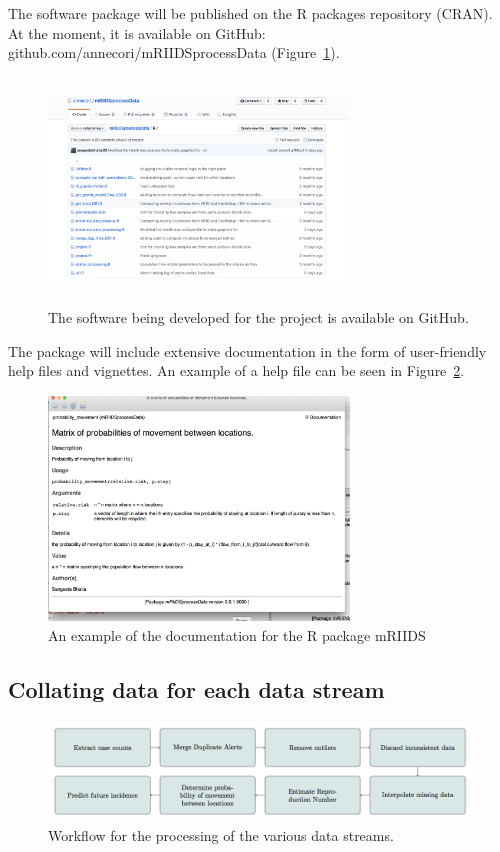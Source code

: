 \documentclass[11pt,]{article}
\begin{document}
The software
package will be published on the R packages repository
(CRAN). At the moment, it is available on GitHub: github.com/annecori/mRIIDSprocessData (Figure~\ref{fig:github}).

\begin{figure}[h]
   \centering
  \includegraphics[width=8cm, height = 6cm]{ms6-figures/github-screenshot}
  \caption{The software being developed for the project is available
    on GitHub.}
  \label{fig:github}
\end{figure}


The package will include extensive documentation in the form of
user-friendly help files and vignettes. An example of a help file can
be seen in Figure~\ref{fig:helpfile}.


\begin{figure}
  \centering
  \includegraphics[width=8cm, height = 6cm]{ms6-figures/Helpfile-screenshot}
  \caption{An example of the documentation for the R package mRIIDS}
  \label{fig:helpfile}
\end{figure}

\FloatBarrier
\subsection{Collating data for each data stream}
\begin{center}
\begin{figure}
\includegraphics[]{ms6-figures/workflow}
\caption{Workflow for the processing of the various data streams.}
\label{fig:workflow}
\end{figure}
\end{center}
\end{document}
